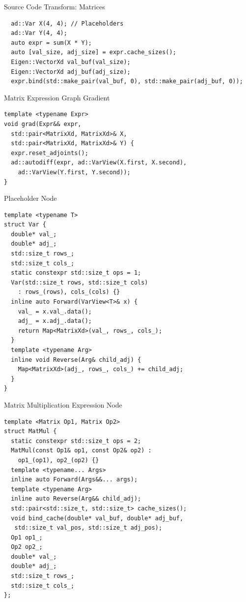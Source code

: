 \documentclass[dvipsnames, aspectratio=169]{beamer}
\begin{document}
\begin{frame}[fragile]{Source Code Transform: Matrices}
\begin{verbatim}
  ad::Var X(4, 4); // Placeholders
  ad::Var Y(4, 4);
  auto expr = sum(X * Y);
  auto [val_size, adj_size] = expr.cache_sizes();
  Eigen::VectorXd val_buf(val_size);
  Eigen::VectorXd adj_buf(adj_size);
  expr.bind(std::make_pair(val_buf, 0), std::make_pair(adj_buf, 0));
\end{verbatim}
\end{frame}

\begin{frame}[fragile]{Matrix Expression Graph Gradient}
\begin{verbatim}
template <typename Expr>
void grad(Expr&& expr, 
  std::pair<MatrixXd, MatrixXd>& X, 
  std::pair<MatrixXd, MatrixXd>& Y) {
  expr.reset_adjoints();
  ad::autodiff(expr, ad::VarView(X.first, X.second), 
    ad::VarView(Y.first, Y.second));
}
\end{verbatim}
\end{frame}

\begin{frame}[fragile]{Placeholder Node}
\begin{verbatim}
template <typename T>
struct Var {
  double* val_;
  double* adj_;
  std::size_t rows_;
  std::size_t cols_;
  static constexpr std::size_t ops = 1;
  Var(std::size_t rows, std::size_t cols)
    : rows_(rows), cols_(cols) {}
  inline auto Forward(VarView<T>& x) {
    val_ = x.val_.data();
    adj_ = x.adj_.data();
    return Map<MatrixXd>(val_, rows_, cols_);
  }
  template <typename Arg>
  inline void Reverse(Arg& child_adj) {
    Map<MatrixXd>(adj_, rows_, cols_) += child_adj;
  }
}
\end{verbatim}
\end{frame}

\begin{frame}[fragile]{Matrix Multiplication Expression Node}
\begin{verbatim}
template <Matrix Op1, Matrix Op2>
struct MatMul {
  static constexpr std::size_t ops = 2;
  MatMul(const Op1& op1, const Op2& op2) : 
    op1_(op1), op2_(op2) {}
  template <typename... Args>
  inline auto Forward(Args&&... args);
  template <typename Arg>
  inline auto Reverse(Arg&& child_adj);
  std::pair<std::size_t, std::size_t> cache_sizes();
  void bind_cache(double* val_buf, double* adj_buf, 
   std::size_t val_pos, std::size_t adj_pos);
  Op1 op1_;
  Op2 op2_;
  double* val_;
  double* adj_;
  std::size_t rows_;
  std::size_t cols_;
};
\end{verbatim}
\end{frame}
\end{document}
